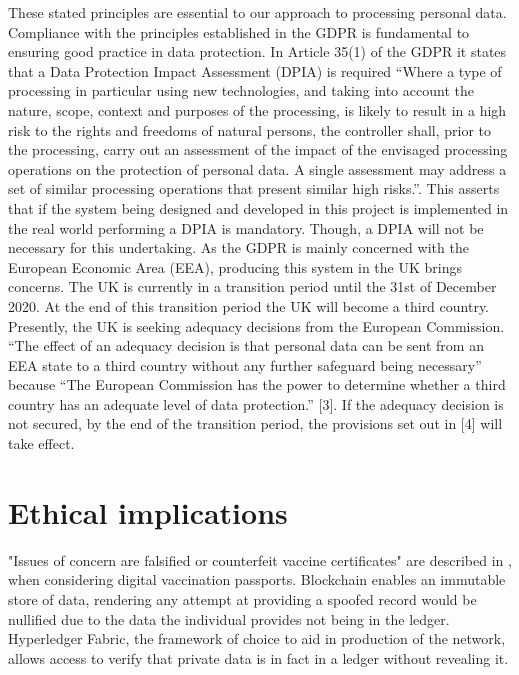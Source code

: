 \documentclass{report}
\begin{document}
\begin{flushleft}
These stated principles are essential to our approach to
processing personal data. Compliance with the principles
established in the GDPR is fundamental to ensuring good
practice in data protection.
In Article 35(1) of the GDPR it states that a Data Protection
Impact Assessment (DPIA) is required “Where a type of
processing in particular using new technologies, and taking
into account the nature, scope, context and purposes of the
processing, is likely to result in a high risk to the rights and
freedoms of natural persons, the controller shall, prior to the
processing, carry out an assessment of the impact of the
envisaged processing operations on the protection of personal
data. A single assessment may address a set of similar
processing operations that present similar high risks.”. This
asserts that if the system being designed and developed in this
project is implemented in the real world performing a DPIA is
mandatory. Though, a DPIA will not be necessary for this
undertaking.
As the GDPR is mainly concerned with the European
Economic Area (EEA), producing this system in the UK
brings concerns. The UK is currently in a transition period
until the 31st of December 2020. At the end of this transition
period the UK will become a third country. Presently, the UK
is seeking adequacy decisions from the European
Commission. “The effect of an adequacy decision is that
personal data can be sent from an EEA state to a third country
without any further safeguard being necessary” because “The
European Commission has the power to determine whether a
third country has an adequate level of data protection.” [3]. If
the adequacy decision is not secured, by the end of the
transition period, the provisions set out in [4] will take effect.

\chapter{Ethical implications}
"Issues of concern are falsified or counterfeit vaccine certificates" are described in \cite{schlagenhauf_variants_2021}, when considering digital vaccination passports. 
Blockchain enables an immutable store of data, rendering any attempt at providing a spoofed record would be nullified due to the data the individual provides not being in the ledger.
Hyperledger Fabric, the framework of choice to aid in production of the network, allows access to verify that private data is in fact in a ledger without revealing it. %



\end{flushleft}
\end{document}

